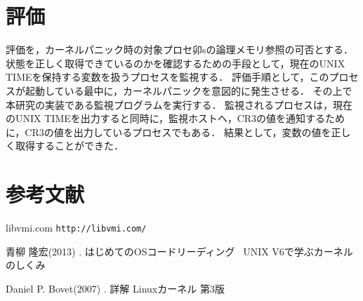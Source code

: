 \documentclass[a4j,10pt]{jsarticle}
\begin{document}
    \section{評価}

    評価を，カーネルパニック時の対象プロセ卯sの論理メモリ参照の可否とする．
    状態を正しく取得できているのかを確認するための手段として，現在のUNIX TIMEを保持する変数を扱うプロセスを監視する．
    評価手順として，このプロセスが起動している最中に，カーネルパニックを意図的に発生させる．
    その上で本研究の実装である監視プログラムを実行する．
    監視されるプロセスは，現在のUNIX TIMEを出力すると同時に，監視ホストへ，CR3の値を通知するために，CR3の値を出力しているプロセスでもある．
    結果として，変数の値を正しく取得することができた．

    \section{参考文献}

    \begin{thebibliography}{99}
		libvmi.com
        \texttt{http://libvmi.com/}

        青柳 隆宏(2013) . はじめてのOSコードリーディング ~UNIX V6で学ぶカーネルのしくみ

        Daniel P. Bovet(2007) . 詳解 Linuxカーネル 第3版
    \end{thebibliography}
\end{document}
